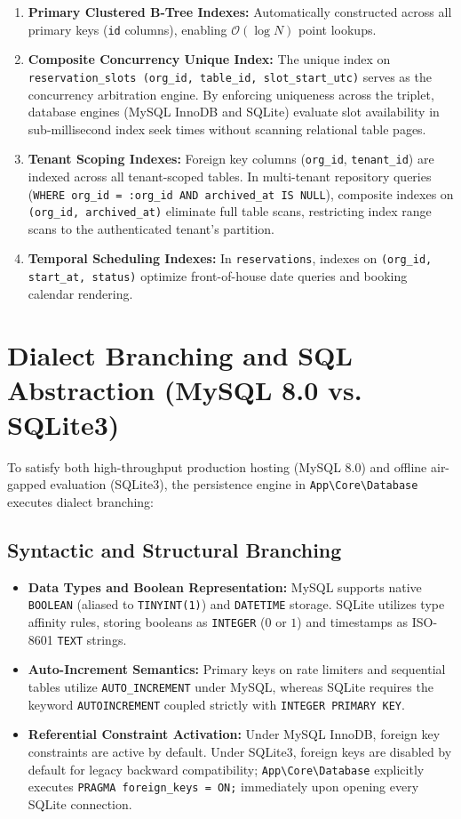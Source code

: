 \begin{enumerate}
    \item \textbf{Primary Clustered B-Tree Indexes:} Automatically constructed across all primary keys (\texttt{id} columns), enabling $\mathcal{O}(\log N)$ point lookups.
    \item \textbf{Composite Concurrency Unique Index:} The unique index on \texttt{reservation\_slots (org\_id, table\_id, slot\_start\_utc)} serves as the concurrency arbitration engine. By enforcing uniqueness across the triplet, database engines (MySQL InnoDB and SQLite) evaluate slot availability in sub-millisecond index seek times without scanning relational table pages.
    \item \textbf{Tenant Scoping Indexes:} Foreign key columns (\texttt{org\_id}, \texttt{tenant\_id}) are indexed across all tenant-scoped tables. In multi-tenant repository queries (\texttt{WHERE org\_id = :org\_id AND archived\_at IS NULL}), composite indexes on \texttt{(org\_id, archived\_at)} eliminate full table scans, restricting index range scans to the authenticated tenant's partition.
    \item \textbf{Temporal Scheduling Indexes:} In \texttt{reservations}, indexes on \texttt{(org\_id, start\_at, status)} optimize front-of-house date queries and booking calendar rendering.
\end{enumerate}

\section{Dialect Branching and SQL Abstraction (MySQL 8.0 vs. SQLite3)}
\label{sec:db_dialect_branching}
To satisfy both high-throughput production hosting (MySQL 8.0) and offline air-gapped evaluation (SQLite3), the persistence engine in \texttt{App\textbackslash Core\textbackslash Database} executes dialect branching:

\subsection{Syntactic and Structural Branching}
\begin{itemize}
    \item \textbf{Data Types and Boolean Representation:} MySQL supports native \texttt{BOOLEAN} (aliased to \texttt{TINYINT(1)}) and \texttt{DATETIME} storage. SQLite utilizes type affinity rules, storing booleans as \texttt{INTEGER} ($0$ or $1$) and timestamps as ISO-8601 \texttt{TEXT} strings.
    \item \textbf{Auto-Increment Semantics:} Primary keys on rate limiters and sequential tables utilize \texttt{AUTO\_INCREMENT} under MySQL, whereas SQLite requires the keyword \texttt{AUTOINCREMENT} coupled strictly with \texttt{INTEGER PRIMARY KEY}.
    \item \textbf{Referential Constraint Activation:} Under MySQL InnoDB, foreign key constraints are active by default. Under SQLite3, foreign keys are disabled by default for legacy backward compatibility; \texttt{App\textbackslash Core\textbackslash Database} explicitly executes \texttt{PRAGMA foreign\_keys = ON;} immediately upon opening every SQLite connection.
\end{itemize}

